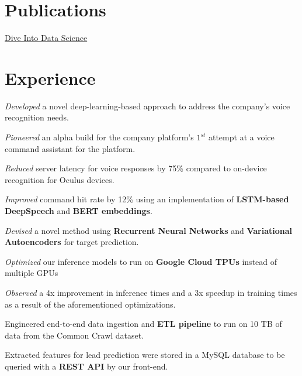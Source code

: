 \documentclass[]{devanshu-resume-openfont}
\begin{document}
\begin{minipage}[t]{0.33\textwidth}
\section{Publications}
\href{https://eldridgejm.github.io/dive_into_data_science/front.html}{Dive Into Data Science}

%
%

\end{minipage}
\hfill
\begin{minipage}[t]{0.66\textwidth}


\section{Experience}
\vspace{\topsep} %
\begin{tightemize}
\item \emph{Developed} a novel deep-learning-based approach to address the company's voice recognition needs.
\item \emph{Pioneered} an alpha build for the company platform's $1^{st}$ attempt at a voice command assistant for the platform.
\item \emph{Reduced} server latency for voice responses by 75\% compared to on-device recognition for Oculus devices.
\item \emph{Improved} command hit rate by 12\% using an implementation of \textbf{LSTM-based DeepSpeech} and \textbf{BERT embeddings}.
\end{tightemize}
\sectionsep

\begin{tightemize}
\item \emph{Devised} a novel method using \textbf{Recurrent Neural Networks} and \textbf{Variational Autoencoders} for target prediction.
\item \emph{Optimized} our inference models to run on \textbf{Google Cloud TPUs} instead of multiple GPUs
\item \emph{Observed} a 4x improvement in inference times and a 3x speedup in training times as a result of the aforementioned optimizations.
\item {Engineered} end-to-end data ingestion and \textbf{ETL pipeline} to
    run on 10 TB of data from the Common Crawl dataset.
\item Extracted features for lead prediction were stored in a MySQL database to be queried with a \textbf{REST API} by our front-end.
\end{tightemize}
\sectionsep


\end{minipage}
\end{document}

